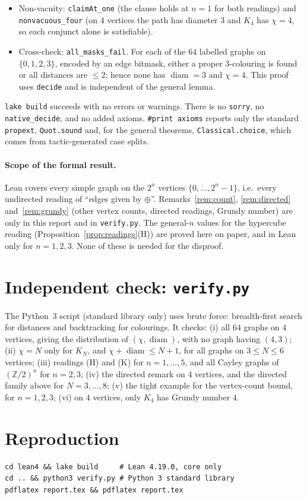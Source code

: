 \documentclass[11pt]{article}
\theoremstyle{definition}
\theoremstyle{remark}
\begin{document}
\begin{itemize}
\texttt{nimComplete} ($u\oplus v\ne0$), both defined with Lean's bitwise
\texttt{\^{}\^{}\^{}}. Proved: \texttt{hypercube2\_chi}, \texttt{hypercube3\_chi}
($\chi=2$), \texttt{hypercube2\_diam}, \texttt{hypercube3\_diam} (diameter $2$,
$3$), \texttt{nimComplete\_chi} ($\chi=N$ for all $N$, via \texttt{pigeonhole}),
\texttt{nimComplete\_diam} (diameter $1$ for $N\ge2$), and
\texttt{hypercube\_reading\_false}, \texttt{complete\_reading\_false}.
\item Non-vacuity: \texttt{claimAt\_one} (the clause holds at $n=1$ for both
readings) and \texttt{nonvacuous\_four} (on $4$ vertices the path has diameter
$3$ and $K_4$ has $\chi=4$, so each conjunct alone is satisfiable).
\item Cross-check: \texttt{all\_masks\_fail}. For each of the $64$ labelled graphs
on $\{0,1,2,3\}$, encoded by an edge bitmask, either a proper $3$-colouring is
found or all distances are $\le2$; hence none has $\operatorname{diam}=3$ and
$\chi=4$. This proof uses \texttt{decide} and is independent of the general
lemma.
\end{itemize}
\texttt{lake build} succeeds with no errors or warnings. There is no
\texttt{sorry}, no \texttt{native\_decide}, and no added axioms. \texttt{\#print
axioms} reports only the standard \texttt{propext}, \texttt{Quot.sound} and, for the
general theorems, \texttt{Classical.choice}, which comes from tactic-generated
case splits.

\paragraph{Scope of the formal result.} Lean covers every simple graph on the
$2^n$ vertices $\{0,\dots,2^n-1\}$, i.e.\ every undirected reading of
``edges given by $\oplus$''. Remarks~\ref{rem:count}, \ref{rem:directed} and~\ref{rem:grundy}
(other vertex counts, directed readings, Grundy number) are only in this report and in
\texttt{verify.py}. The general-$n$ values for the hypercube reading
(Proposition~\ref{prop:readings}(H)) are proved here on paper, and in Lean only
for $n=1,2,3$. None of these is needed for the disproof.

\section{Independent check: \texttt{verify.py}}
The Python~3 script (standard library only) uses brute force: breadth-first
search for distances and backtracking for colourings. It checks:
(i) all $64$ graphs on $4$ vertices, giving the distribution of
$(\chi,\operatorname{diam})$, with no graph having $(4,3)$;
(ii) $\chi=N$ only for $K_N$, and $\chi+\operatorname{diam}\le N+1$, for all graphs
on $3\le N\le6$ vertices;
(iii) readings (H) and (K) for $n=1,\dots,5$, and all Cayley graphs of
$(\mathbb Z/2)^n$ for $n=2,3$;
(iv) the directed remark on $4$ vertices, and the directed family above for
$N=3,\dots,8$;
(v) the tight example for the vertex-count bound, for $n=1,2,3$;
(vi) on $4$ vertices, only $K_4$ has Grundy number $4$.

\section{Reproduction}
\begin{verbatim}
cd lean4 && lake build     # Lean 4.19.0, core only
cd .. && python3 verify.py # Python 3 standard library
pdflatex report.tex && pdflatex report.tex
\end{verbatim}
\end{document}
